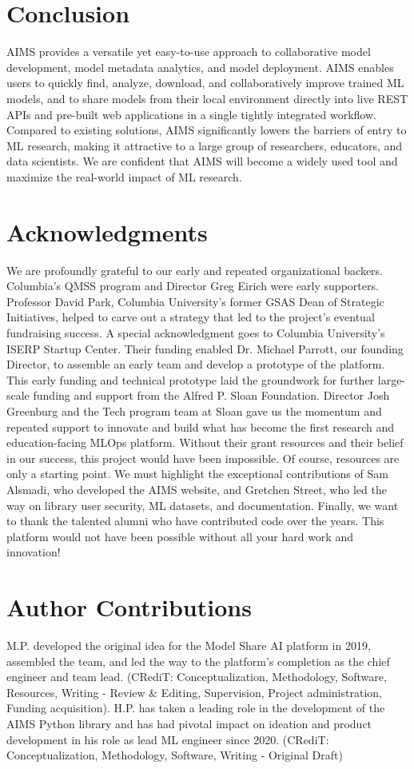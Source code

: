 \section{Conclusion}
AIMS provides a versatile yet easy-to-use approach to collaborative model development, model metadata analytics, and model deployment. AIMS enables users to quickly find, analyze, download, and collaboratively improve trained ML models, and to share models from their local environment directly into live REST APIs and pre-built web applications in a single tightly integrated workflow. Compared to existing solutions, AIMS significantly lowers the barriers of entry to ML research, making it attractive to a large group of researchers, educators, and data scientists. We are confident that AIMS will become a widely used tool and maximize the real-world impact of  ML research.

\newpage
\section*{Acknowledgments}
We are profoundly grateful to our early and repeated organizational backers. Columbia’s QMSS program and Director Greg Eirich were early supporters. Professor David Park, Columbia University’s former GSAS Dean of Strategic Initiatives, helped to carve out a strategy that led to the project’s eventual fundraising success. A special acknowledgment goes to Columbia University's ISERP Startup Center. Their funding enabled Dr. Michael Parrott, our founding Director, to assemble an early team and develop a prototype of the platform. This early funding and technical prototype laid the groundwork for further large-scale funding and support from the Alfred P. Sloan Foundation. Director Josh Greenburg and the Tech program team at Sloan gave us the momentum and repeated support to innovate and build what has become the first research and education-facing MLOps platform. Without their grant resources and their belief in our success, this project would have been impossible. Of course, resources are only a starting point. We must highlight the exceptional contributions of Sam Alsmadi, who developed the AIMS website, and Gretchen Street, who led the way on library user security, ML datasets, and documentation. Finally, we want to thank the talented alumni who have contributed code over the years. This platform would not have been possible without all your hard work and innovation!

\section*{Author Contributions}
M.P. developed the original idea for the Model Share AI platform in 2019, assembled the team, and led the way to the platform's completion as the chief engineer and team lead. (CRediT: Conceptualization, Methodology, Software, Resources, Writing - Review \& Editing, Supervision, Project administration, Funding acquisition). H.P. has taken a leading role in the development of the AIMS Python library and has had pivotal impact on ideation and product development in his role as lead ML engineer since 2020. (CRediT: Conceptualization, Methodology, Software, Writing - Original Draft)

